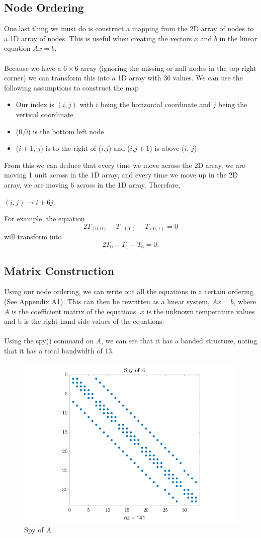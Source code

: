 \documentclass[12pt,a4paper]{article}
\begin{document}
\subsection{Node Ordering}
One last thing we must do is construct a mapping from the 2D array of nodes to a 1D array of nodes. This is useful when creating the vectors $x$ and $b$ in the linear equation $Ax=b$.
\\\\
Because we have a $6 \times 6$ array (ignoring the missing or null nodes in the top right corner) we can transform this into a 1D array with 36 values. We can use the following assumptions to construct the map \begin{itemize}
\item Our index is $(i,j)$ with $i$ being the horizontal coordinate and $j$ being the vertical coordinate 
\item (0,0) is the bottom left node 
\item ($i+1$, $j$) is to the right of ($i$,$j$) and ($i$,$j+1$) is above ($i$, $j$)
\end{itemize}
From this we can deduce that every time we move across the 2D array, we are moving 1 unit across in the 1D array, and every time we move up in the 2D array, we are moving 6 across in the 1D array. Therefore,
\begin{center}
$(i,j) \to i+6j$.
\end{center}
For example, the equation
\[2T_{(0,0)}-T_{(1,0)}-T_{(0,1)}=0\]
will transform into
\[2T_0-T_1-T_6=0.\]
\subsection{Matrix Construction}
Using our node ordering, we can write out all the equations in a certain ordering (See Appendix A1). This can then be rewritten as a linear system, $Ax=b$, where $A$ is the coefficient matrix of the equations, $x$ is the unknown temperature values and b is the right hand side values of the equations.\\\\Using the spy() command on $A$, we can see that it has a banded structure, noting that it has a total bandwidth of 13.
\begin{figure}[H]
	\includegraphics[width=\linewidth]{images/spyA.png}
	\caption{Spy of $A$.}
	\label{fig:spyA}
\end{figure}
\end{document}
